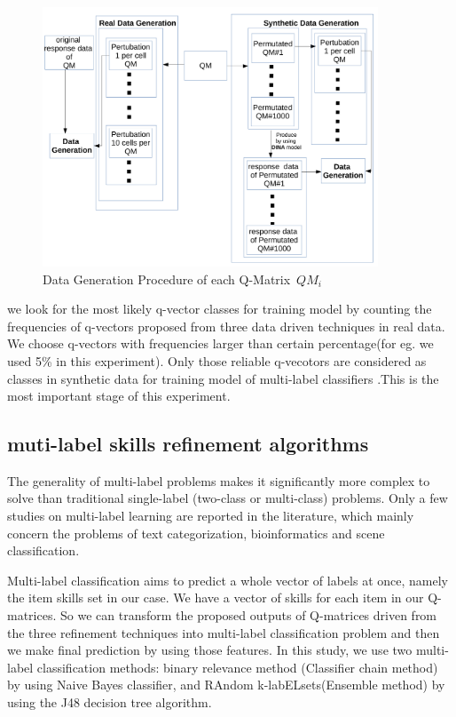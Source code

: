\documentclass[11pt]{article}
\begin{document}
\begin{figure}
  \centering
    \includegraphics[width=100mm ,scale=0.5]{graph/DG.pdf}
  \caption{Data Generation Procedure of each Q-Matrix~$QM_i$}  \label{fig:DG}
\end{figure}

 we look for the most likely q-vector classes for training model by counting the frequencies of q-vectors proposed from three data driven techniques in real data. We choose q-vectors with frequencies larger than certain percentage(for eg. we used 5\% in this experiment). Only those reliable q-vecotors are considered as classes in synthetic data for training model of multi-label classifiers .This is the most important stage of this experiment.  

\subsection{muti-label skills refinement algorithms}

The generality of multi-label problems makes it significantly more complex to solve than traditional single-label (two-class or multi-class) problems. Only a few studies on multi-label learning are reported in the literature, which mainly concern the problems of text categorization, bioinformatics and scene classification. 

Multi-label classification aims to predict a whole vector of labels at once, namely the item skills set in our case. We have a vector of skills for each item in our Q-matrices. So we can transform the proposed outputs of Q-matrices driven from the three refinement techniques into multi-label classification problem and then we make final prediction by using those features. In this study, we use two multi-label classification methods: binary relevance method (Classifier chain method)~\cite{read2011classifier} by using Naive Bayes classifier, and RAndom k-labELsets(Ensemble method) \cite{Tsoumakas2011random} by using the J48 decision tree algorithm.
\end{document}
